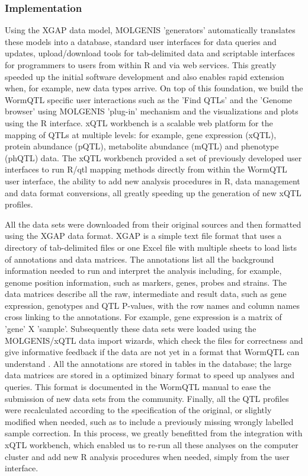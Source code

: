 \subsubsection{Implementation}
Using the XGAP data model, MOLGENIS 'generators' automatically translates these models into a 
database, standard user interfaces for data queries and updates, upload/download tools for 
tab-delimited data and scriptable interfaces for programmers to users from within R and via 
web services. This greatly speeded up the initial software development and also enables rapid 
extension when, for example, new data types arrive. On top of this foundation, we build the 
WormQTL specific user interactions such as the 'Find QTLs' and the 'Genome browser' using 
MOLGENIS 'plug-in' mechanism and the visualizations and plots using the R interface. xQTL 
workbench is a scalable web platform for the mapping of QTLs at multiple levels: for example, 
gene expression (xQTL), protein abundance (pQTL), metabolite abundance (mQTL) and phenotype 
(phQTL) data. The xQTL workbench provided a set of previously developed user interfaces to 
run R/qtl mapping methods directly from within the WormQTL user interface, the ability to 
add new analysis procedures in R, data management and data format conversions, all greatly 
speeding up the generation of new xQTL profiles.

All the data sets were downloaded from their original sources and then formatted using the 
XGAP data format. XGAP is a simple text file format that uses a directory of tab-delimited 
files or one Excel file with multiple sheets to load lists of annotations and data matrices. 
The annotations list all the background information needed to run and interpret the analysis 
including, for example, genome position information, such as markers, genes, probes and 
strains. The data matrices describe all the raw, intermediate and result data, such as gene 
expression, genotypes and QTL P-values, with the row names and column names cross linking to 
the annotations. For example, gene expression is a matrix of 'gene' X 'sample'. Subsequently 
these data sets were loaded using the MOLGENIS/xQTL data import wizards, which check the 
files for correctness and give informative feedback if the data are not yet in a format that 
WormQTL can understand \cite{Swertz:2010a}. All the annotations are stored in tables in the database; the 
large data matrices are stored in a optimized binary format to speed up analyses and queries. 
This format is documented in the WormQTL manual to ease the submission of new data sets from 
the community. Finally, all the QTL profiles were recalculated according to the specification 
of the original, or slightly modified when needed, such as to include a previously missing 
wrongly labelled sample correction. In this process, we greatly benefitted from the integration 
with xQTL workbench, which enabled us to re-run all these analyses on the computer cluster 
and add new R analysis procedures when needed, simply from the user interface.


